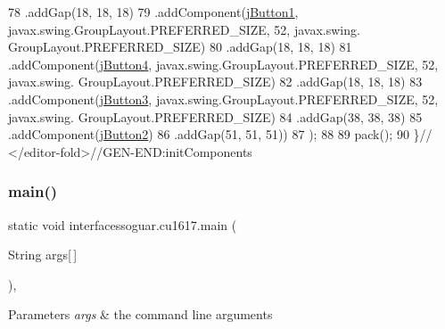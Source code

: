 \begin{DoxyCode}
78                 .addGap(18, 18, 18)
79                 .addComponent(\mbox{\hyperlink{classinterfacessoguar_1_1cu1617_a50f641f67c27a9b417d476ee81a6d982}{jButton1}}, javax.swing.GroupLayout.PREFERRED\_SIZE, 52, javax.swing.
      GroupLayout.PREFERRED\_SIZE)
80                 .addGap(18, 18, 18)
81                 .addComponent(\mbox{\hyperlink{classinterfacessoguar_1_1cu1617_a8a8f5dee729cb00cabe4a95e51011050}{jButton4}}, javax.swing.GroupLayout.PREFERRED\_SIZE, 52, javax.swing.
      GroupLayout.PREFERRED\_SIZE)
82                 .addGap(18, 18, 18)
83                 .addComponent(\mbox{\hyperlink{classinterfacessoguar_1_1cu1617_ab6bee6d7b3c436f015dc73e19b861fe4}{jButton3}}, javax.swing.GroupLayout.PREFERRED\_SIZE, 52, javax.swing.
      GroupLayout.PREFERRED\_SIZE)
84                 .addGap(38, 38, 38)
85                 .addComponent(\mbox{\hyperlink{classinterfacessoguar_1_1cu1617_a47c3aa6c8836a1ff965ecef05f6d0e2f}{jButton2}})
86                 .addGap(51, 51, 51))
87         );
88 
89         pack();
90     \}\textcolor{comment}{// </editor-fold>//GEN-END:initComponents}
\end{DoxyCode}
\mbox{\label{classinterfacessoguar_1_1cu1617_aee8e1c23f84bb7c8c65ac36fa35c32e4}} 
\subsubsection{\texorpdfstring{main()}{main()}}
{\footnotesize\ttfamily static void interfacessoguar.\+cu1617.\+main (\begin{DoxyParamCaption}\item[{String}]{args\mbox{[}$\,$\mbox{]} }\end{DoxyParamCaption})\hspace{0.3cm}{\ttfamily [inline]}, {\ttfamily [static]}}


\begin{DoxyParams}{Parameters}
{\em args} & the command line arguments \\
\hline
\end{DoxyParams}

